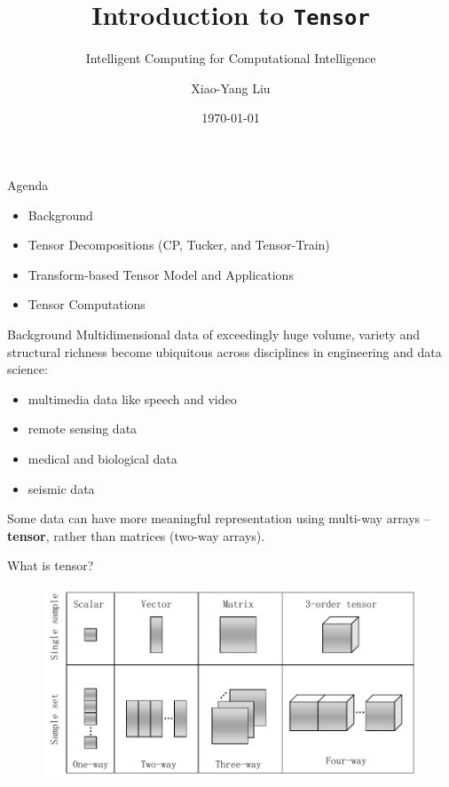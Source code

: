 \documentclass[t, 10pt, handout, aspectratio=169]{beamer}
\title[Introduction to Tensor]{Introduction to \texttt{Tensor}}
\subtitle{Intelligent Computing for Computational Intelligence}
\author[yanglet]{Xiao-Yang Liu}
\institute[CU]{Columbia University}
\date[\number\month/\number\day/\number\year]{\today}
\begin{document}
\begin{frame}
  \titlepage
\end{frame}

\begin{frame}{Agenda}
\begin{itemize}
    \large \item Background
    \large \item {Tensor Decompositions (CP, Tucker, and Tensor-Train)}
    \large \item{Transform-based Tensor Model and Applications}
    \large \item{Tensor Computations}
\end{itemize}
\end{frame}

\begin{frame}{Background}
\large Multidimensional data of exceedingly huge volume, variety and structural richness become ubiquitous across disciplines in engineering and data science:
\begin{itemize}
    \item multimedia data like speech and video
    \item remote sensing data
    \item medical and biological data
    \item seismic data
\end{itemize}
\margin
\large Some data can have more meaningful representation using multi-way arrays -- \textbf{tensor}, rather than matrices (two-way arrays).
\end{frame}

\begin{frame}{What is tensor?}
\begin{figure}
	\centering  
	\includegraphics[height=0.7\paperheight]{figs/tensor_sample}
	\label{fig:tensor_sample}
\end{figure}
\end{frame}
\end{document}
